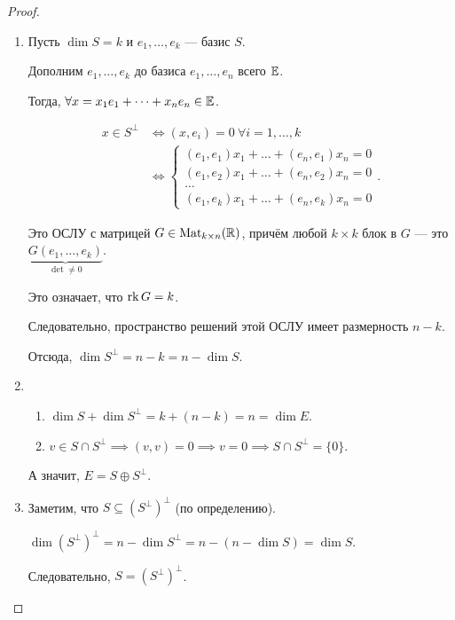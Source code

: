 \begin{proof}~
    \begin{enumerate}
    \item 
        Пусть $\dim S = k$ и $e_1, \dots, e_k$ --- базис $S$.
        
        Дополним $e_1, \dots, e_k$ до базиса $e_1, \dots, e_n$ всего $\mathbb{E}$.

        Тогда, $\forall x = x_1 e_1 + \dots + x_n e_n \in \mathbb{E}$.

        \begin{align*}
            x \in S^{\perp} &\iff (x, e_i) = 0 \ \forall i = 1, \dots, k \\
                            &\iff \begin{cases}
                                (e_1, e_1) x_1 + \dots + (e_n, e_1) x_n = 0 \\
                                (e_1, e_2) x_1 + \dots + (e_n, e_2) x_n = 0 \\
                                \dots \\
                                (e_1, e_k) x_1 + \dots + (e_n, e_k) x_n = 0
                            \end{cases}
        .\end{align*}

        Это ОСЛУ с матрицей $G \in \text{Mat}_{k \times n}(\mathbb{R})$, причём любой $k \times k$ блок в $G$ --- это $\underbrace{G(e_1, \dots, e_k)}_{\det \neq 0}$.

        Это означает, что $\operatorname{\mathop{\mathrm{rk}}} G = k$.

        Следовательно, пространство решений этой ОСЛУ имеет размерность $n - k$.

        Отсюда, $\dim S^{\perp} = n - k = n - \dim S$.

    \item
        \begin{enumerate}
        \item $\dim S + \dim S^{\perp} = k + (n - k) = n = \dim E$.
        \item $v \in S \cap S^{\perp} \implies (v, v) = 0 \implies v = 0 \implies S \cap S^{\perp} = \{0\}$.
        \end{enumerate}

        А значит, $E = S \oplus S^{\perp}$.

    \item
        Заметим, что $S \subseteq (S^{\perp})^{\perp}$ (по определению).

        $\dim (S^{\perp})^{\perp} = n - \dim S^{\perp} = n - (n - \dim S) = \dim S$.

        Следовательно, $S = (S^{\perp})^{\perp}$.
        \qedhere
    \end{enumerate}
\end{proof}


